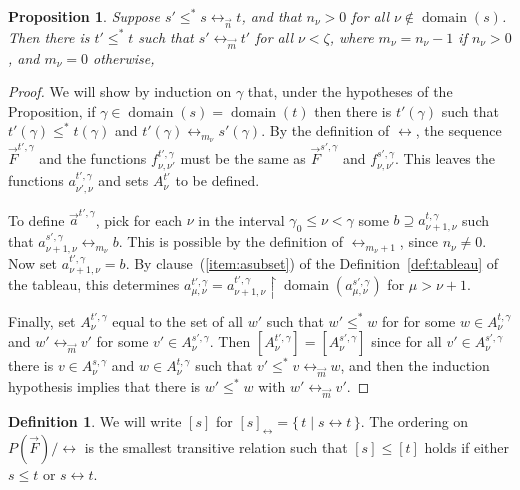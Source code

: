 \documentclass[
twoside,
]{article}
\newtheorem{proposition}[theorem]{Proposition}
\theoremstyle{definition}
\newtheorem{definition}[theorem]{Definition}
\theoremstyle{remark}
\newcommand\gkeq{\leftrightarrow}
\newcommand\mgkeq{/{\gkeq}}
\newcommand{\set}[1]{\{\,#1\,\}}
\newcommand{\restrict}{{\upharpoonright}}
\DeclareMathOperator{\domain}{domain}
\begin{document}
\begin{proposition}
  \label{thm:direct-gkeq}
  Suppose $s'\leq^* s\gkeq_{\vec n} t$, and that $n_{\nu}>0$ for all
  $\nu\notin\domain(s)$.  Then there is $t'\leq^* t$ such
  that $s'\gkeq_{\vec m} t'$ for all
  $\nu<\zeta$, where $m_{\nu} = n_{\nu} - 1$ if
  $n_{\nu}>0$, and $m_{\nu}=0$ otherwise, 
\end{proposition}
\begin{proof}
  We will show by induction on $\gamma$ that, under the hypotheses of the Proposition, if   $\gamma\in\domain(s)=\domain(t)$ then there is  $t'(\gamma)$ such that
  $t'(\gamma)\leq^* t(\gamma)$ and $t'(\gamma)\gkeq_{m_{\nu}}s'(\gamma)$.    By the definition of $\gkeq$, 
  the sequence  $\vec F^{t',\gamma}$ and the functions
  $f^{t',\gamma}_{\nu,\nu'}$ must  be the same as $\vec
  F^{s',\gamma}$ and $f^{s',\gamma}_{\nu,\nu'}$.    This leaves the
  functions $a^{t',\gamma}_{\nu',\nu}$ and sets $A^{t'}_{\nu}$ to be
  defined.  

  To define $\vec a^{t',\gamma}$, pick for each $\nu$ in the interval
  $\gamma_0\leq\nu<\gamma$ some $b\supseteq a^{t,\gamma}_{\nu+1,\nu}$ such that
  $a^{s',\gamma}_{\nu+1,\nu}\gkeq_{m_{\nu}} b$.   This is possible by
  the definition of $\gkeq_{m_{\nu}+1}$, since $n_\nu\not=0$.   Now set
  $a^{t',\gamma}_{\nu+1,\nu}=b$.   By clause~(\ref{item:asubset}) of 
  the Definition~\ref{def:tableau} of the tableau, this determines
  $a^{t',\gamma}_{\mu,\nu}=a^{t',\gamma}_{\nu+1,\nu}\restrict\domain(a^{s',\gamma}_{\mu,\nu})$
  for $\mu>\nu+1$.  

  Finally, set $A^{t',\gamma}_{\nu}$ equal to  the set of all $w'$ such
  that $w'\leq^* w$ for for some $w\in A^{t,\gamma}_{\nu}$ and
  $w'\gkeq_{\vec m} v'$ for some $v'\in A^{s',\gamma}_{\nu}$.     Then
  $ [A^{t',\gamma}_{\nu}]=[A^{s',\gamma}_{\nu}]$ since for all
  $v'\in A^{s',\gamma}_{\nu}$ there is $v\in A^{s,\gamma}_{\nu}$ and
  $w\in A^{t,\gamma}_{\nu}$ such that $v'\leq^* v\gkeq_{\vec m}w$, and
  then the induction hypothesis implies that there is $w'\leq^* w$ with
  $w'\gkeq _{\vec m} v'$.     
\end{proof}
\begin{definition}
  \label{def:modgekq}
  We will write $[s]$ for $[s]_{\gkeq}=\set{t\mid s\gkeq t}$.   The
  ordering on $P(\vec F)\mgkeq$ is the smallest transitive relation such
  that $[s]\leq[t]$ holds if either $s\leq t$  or  $s\gkeq t$.
\end{definition}
\end{document}
